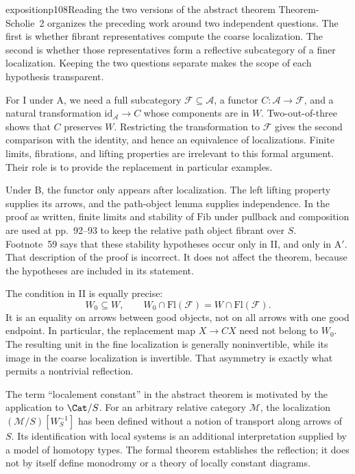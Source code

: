 \begin{dcomment}{exposition}{p108}{Reading the two versions of the abstract theorem}
Theorem-Scholie~2 organizes the preceding work around two independent questions. The first is whether fibrant representatives compute the coarse localization. The second is whether those representatives form a reflective subcategory of a finer localization. Keeping the two questions separate makes the scope of each hypothesis transparent.

For I under A, we need a full subcategory $\mathcal F\subseteq\mathcal A$, a functor $C:\mathcal A\to\mathcal F$, and a natural transformation $\mathrm{id}_{\mathcal A}\to C$ whose components are in $W$. Two-out-of-three shows that $C$ preserves $W$. Restricting the transformation to $\mathcal F$ gives the second comparison with the identity, and hence an equivalence of localizations. Finite limits, fibrations, and lifting properties are irrelevant to this formal argument. Their role is to provide the replacement in particular examples.

Under B, the functor only appears after localization. The left lifting property supplies its arrows, and the path-object lemma supplies independence. In the proof as written, finite limits and stability of $\mathrm{Fib}$ under pullback and composition are used at pp.~92--93 to keep the relative path object fibrant over $S$. Footnote~59 says that these stability hypotheses occur only in II, and only in A$'$. That description of the proof is incorrect. It does not affect the theorem, because the hypotheses are included in its statement.

The condition in II is equally precise:
\[
 W_0\subseteq W,
 \qquad W_0\cap\mathrm{Fl}(\mathcal F)
       =W\cap\mathrm{Fl}(\mathcal F).
\]
It is an equality on arrows between good objects, not on all arrows with one good endpoint. In particular, the replacement map $X\to CX$ need not belong to $W_0$. The resulting unit in the fine localization is generally noninvertible, while its image in the coarse localization is invertible. That asymmetry is exactly what permits a nontrivial reflection.

The term ``localement constant'' in the abstract theorem is motivated by the application to $\Cat/S$. For an arbitrary relative category $\mathcal M$, the localization $(\mathcal M/S)[W_S^{-1}]$ has been defined without a notion of transport along arrows of $S$. Its identification with local systems is an additional interpretation supplied by a model of homotopy types. The formal theorem establishes the reflection; it does not by itself define monodromy or a theory of locally constant diagrams.
\end{dcomment}

